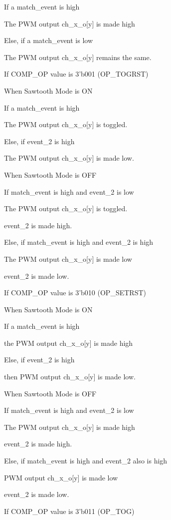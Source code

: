         If a match_event is high

            The PWM output ch_x_o[y] is made high

        Else, if a match_event is low

            The PWM output ch_x_o[y] remains the same.

    If COMP_OP value is 3’b001 (OP_TOGRST)

        When Sawtooth Mode is ON

            If a match_event is high

                The PWM output ch_x_o[y] is toggled.

            Else, if event_2 is high

                The PWM output ch_x_o[y] is made low.

        When Sawtooth Mode is OFF

            If match_event is high and event_2 is low

                The PWM output ch_x_o[y] is toggled.

                event_2 is made high.

            Else, if match_event is high and event_2 is high

                The PWM output ch_x_o[y] is made low

                event_2 is made low.

    If COMP_OP value is 3’b010 (OP_SETRST)

        When Sawtooth Mode is ON

            If a match_event is high

                the PWM output ch_x_o[y] is made high

            Else, if event_2 is high

                then PWM output ch_x_o[y] is made low.

        When Sawtooth Mode is OFF

            If match_event is high and event_2 is low

                The PWM output ch_x_o[y] is made high

                event_2 is made high.

            Else, if match_event is high and event_2 also is high

                PWM output ch_x_o[y] is made low

                event_2 is made low.

    If COMP_OP value is 3’b011 (OP_TOG)

